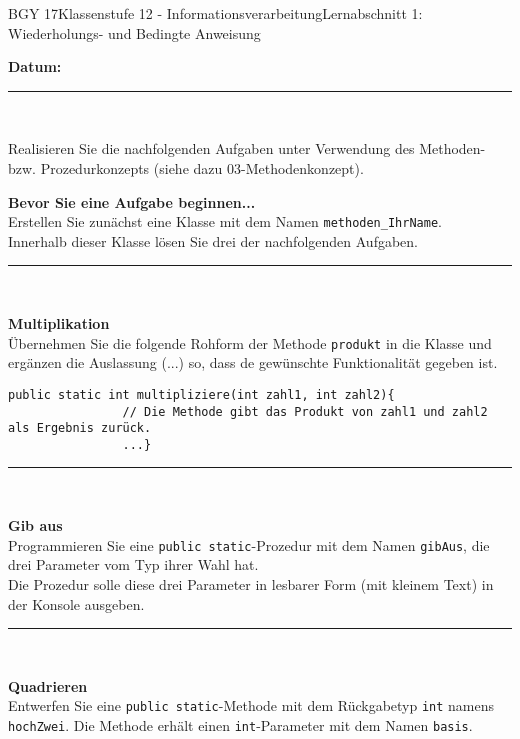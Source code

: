 \documentclass[oneside,openany,headings=optiontotoc,11pt,numbers=noenddot]{scrreprt}
\begin{document}
	\begin{worksheet}{BGY 17}{Klassenstufe 12 - Informationsverarbeitung}{Lernabschnitt 1: Wiederholungs- und Bedingte Anweisung}
				
		\noindent
		\sffamily
		\textbf{Datum:}
		\rule{0.91\textwidth}{0.4pt}\\
		\par\noindent
		Realisieren Sie die nachfolgenden Aufgaben unter Verwendung des Methoden- bzw. Prozedurkonzepts (siehe dazu 03-Methodenkonzept).
		\begin{framed}
			\noindent
			\textbf{Bevor Sie eine Aufgabe beginnen...}\\
			Erstellen Sie zunächst eine Klasse mit dem Namen \lstinline[style=JavaInputStyle]|methoden_IhrName|.\\
			Innerhalb dieser Klasse lösen Sie drei der nachfolgenden Aufgaben.\\
			\rule{\textwidth}{0.1pt}\\
			\par\noindent
			\textbf{Multiplikation}\\
			Übernehmen Sie die folgende Rohform der Methode \lstinline[style=JavaInputStyle]|produkt| in die Klasse und ergänzen die Auslassung (...) so, dass de gewünschte Funktionalität gegeben ist.
			\begin{lstlisting}[style=JavaInputStyle]
				public static int multipliziere(int zahl1, int zahl2){
				// Die Methode gibt das Produkt von zahl1 und zahl2 als Ergebnis zurück.
				...}
			\end{lstlisting}
			\par\noindent
			\rule{\textwidth}{0.1pt}\\
			\par\noindent
			\textbf{Gib aus}\\
			Programmieren Sie eine \lstinline[style=JavaInputStyle]|public static|-Prozedur mit dem Namen \lstinline[style=JavaInputStyle]|gibAus|, die drei Parameter vom Typ ihrer Wahl hat.\\
			Die Prozedur solle diese drei Parameter in lesbarer Form (mit kleinem Text) in der Konsole ausgeben.\\
			\par\noindent
			\rule{\textwidth}{0.1pt}\\
			\par\noindent
			\textbf{Quadrieren}\\
			Entwerfen Sie eine \lstinline[style=JavaInputStyle]|public static|-Methode mit dem Rückgabetyp \lstinline[style=JavaInputStyle]|int| namens \lstinline[style=JavaInputStyle]|hochZwei|. Die Methode erhält einen \lstinline[style=JavaInputStyle]|int|-Parameter mit dem Namen \lstinline[style=JavaInputStyle]|basis|.\\

\end{framed}
\end{worksheet}
\end{document}
